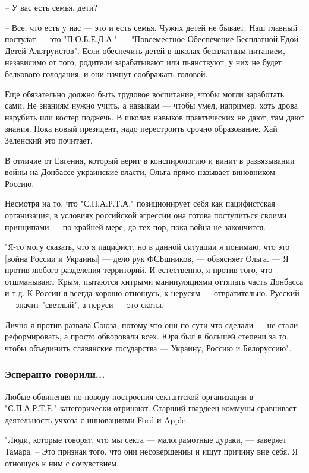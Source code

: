 \documentclass[a4paper,11pt]{extreport}
\begin{document}
– У вас есть семья, дети?

– Все, что есть у нас --- это и есть семья. Чужих детей не бывает. Наш главный
постулат --- это "П.О.Б.Е.Д.А." --- "Повсеместное Обеспечение Бесплатной Едой Детей
Альтруистов". Если обеспечить детей в школах бесплатным питанием, независимо от
того, родители зарабатывают или пьянствуют, у них не будет белкового голодания,
и они начнут соображать головой. 

Еще обязательно должно быть трудовое воспитание, чтобы могли заработать сами.
Не знаниям нужно учить, а навыкам --- чтобы умел, например, хоть дрова нарубить
или костер поджечь. В школах навыков практических не дают, там дают знания.
Пока новый президент, надо перестроить срочно образование. Хай Зеленский это
почитает.

В отличие от Евгения, который верит в конспирологию и винит в развязывании
войны на Донбассе украинские власти, Ольга прямо называет виновником Россию. 

Несмотря на то, что "С.П.А.Р.Т.А." позиционирует себя как пацифистская
организация, в условиях российской агрессии она готова поступиться своими
принципами --- по крайней мере, до тех пор, пока война не закончится.

"Я-то могу сказать, что я пацифист, но в данной ситуации я понимаю, что это
[война России и Украины] --- дело рук ФСБшников, --- объясняет Ольга. --- Я против
любого разделения территорий. И естественно, я против того, что отшманывают
Крым, пытаются хитрыми манипуляциями оттяпать часть Донбасса и т.д. К России я
всегда хорошо отношусь, к нерусям --- отвратительно. Русский --- значит "светлый",
а неруси --- это скоты. 

Лично я против развала Союза, потому что они по сути что сделали --- не стали
реформировать, а просто обворовали всех. Юра был в большей степени за то, чтобы
объединить славянские государства --- Украину, Россию и Белоруссию".

\subsubsection{Эсперанто говорили...}

Любые обвинения по поводу построения сектантской организации в "С.П.А.Р.Т.Е."
категорически отрицают. Старший гвардеец коммуны сравнивает деятельность учхоза
с инновациями Ford и Apple.

"Люди, которые говорят, что мы секта --- малограмотные дураки, --- заверяет Тамара.
– Это признак того, что они несовершенны и ищут причину вне себя. Я отношусь к
ним с сочувствием.
\end{document}
